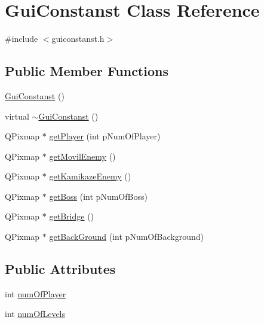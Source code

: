 \hypertarget{class_gui_constanst}{\section{Gui\-Constanst Class Reference}
\label{class_gui_constanst}
}


{\ttfamily \#include $<$guiconstanst.\-h$>$}

\subsection*{Public Member Functions}
\begin{DoxyCompactItemize}
\item 
\hyperlink{class_gui_constanst_ab85d2ae9a89577fcd92555d7b50ad605}{Gui\-Constanst} ()
\item 
virtual \hyperlink{class_gui_constanst_a77988429e2b9100b5b1803e02bd43447}{$\sim$\-Gui\-Constanst} ()
\item 
Q\-Pixmap $\ast$ \hyperlink{class_gui_constanst_af35eb5b02f4d373840be9b68b9239f25}{get\-Player} (int p\-Num\-Of\-Player)
\item 
Q\-Pixmap $\ast$ \hyperlink{class_gui_constanst_a0161d18fc69f5c51c72084567b1e461e}{get\-Movil\-Enemy} ()
\item 
Q\-Pixmap $\ast$ \hyperlink{class_gui_constanst_a6d6d4c99d0dc69d521f18cef478726fd}{get\-Kamikaze\-Enemy} ()
\item 
Q\-Pixmap $\ast$ \hyperlink{class_gui_constanst_af4cfb5e43c5fa96febb9581b42f20b1f}{get\-Boss} (int p\-Num\-Of\-Boss)
\item 
Q\-Pixmap $\ast$ \hyperlink{class_gui_constanst_a7c838c62b5f08d461b2e3d68e513f77b}{get\-Bridge} ()
\item 
Q\-Pixmap $\ast$ \hyperlink{class_gui_constanst_af46ca8e39f4a798237d581f435d26835}{get\-Back\-Ground} (int p\-Num\-Of\-Background)
\end{DoxyCompactItemize}
\subsection*{Public Attributes}
\begin{DoxyCompactItemize}
\item 
int \hyperlink{class_gui_constanst_a98b9e1cb96d5c47abe38413f59c10835}{num\-Of\-Player}
\item 
int \hyperlink{class_gui_constanst_a21e10d5b961508c49dcd1dd76986eda8}{num\-Of\-Levels}
\end{DoxyCompactItemize}


